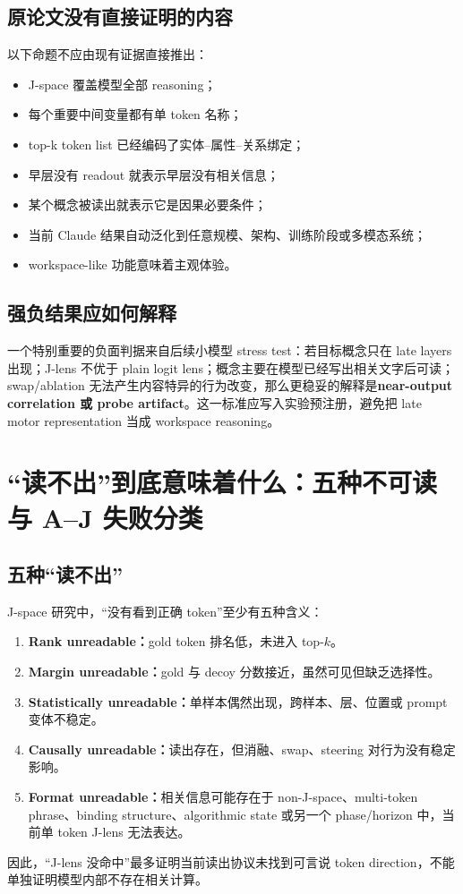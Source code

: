 \documentclass[10.5pt,a4paper]{ctexart}
\begin{document}
\subsection{原论文没有直接证明的内容}
\begin{warningclaim}
以下命题不应由现有证据直接推出：
\begin{itemize}
  \item J-space 覆盖模型全部 reasoning；
  \item 每个重要中间变量都有单 token 名称；
  \item top-k token list 已经编码了实体--属性--关系绑定；
  \item 早层没有 readout 就表示早层没有相关信息；
  \item 某个概念被读出就表示它是因果必要条件；
  \item 当前 Claude 结果自动泛化到任意规模、架构、训练阶段或多模态系统；
  \item workspace-like 功能意味着主观体验。
\end{itemize}
\end{warningclaim}

\subsection{强负结果应如何解释}
一个特别重要的负面判据来自后续小模型 stress test：若目标概念只在 late layers 出现；J-lens 不优于 plain logit lens；概念主要在模型已经写出相关文字后可读；swap/ablation 无法产生内容特异的行为改变，那么更稳妥的解释是\textbf{near-output correlation 或 probe artifact}。这一标准应写入实验预注册，避免把 late motor representation 当成 workspace reasoning。

\section{“读不出”到底意味着什么：五种不可读与 A--J 失败分类}

\subsection{五种“读不出”}
J-space 研究中，“没有看到正确 token”至少有五种含义：
\begin{enumerate}
  \item \textbf{Rank unreadable：}gold token 排名低，未进入 top-$k$。
  \item \textbf{Margin unreadable：}gold 与 decoy 分数接近，虽然可见但缺乏选择性。
  \item \textbf{Statistically unreadable：}单样本偶然出现，跨样本、层、位置或 prompt 变体不稳定。
  \item \textbf{Causally unreadable：}读出存在，但消融、swap、steering 对行为没有稳定影响。
  \item \textbf{Format unreadable：}相关信息可能存在于 non-J-space、multi-token phrase、binding structure、algorithmic state 或另一个 phase/horizon 中，当前单 token J-lens 无法表达。
\end{enumerate}
因此，“J-lens 没命中”最多证明当前读出协议未找到可言说 token direction，不能单独证明模型内部不存在相关计算。
\end{document}
